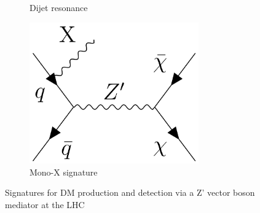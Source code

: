 \begin{figure}[hp]
\begin{subfigure}[t]{0.32\textwidth}
%
%				
\caption{Dijet resonance}
\label{fig:Feynman_Zprime_dijet}
\end{subfigure}
\begin{subfigure}[t]{0.32\textwidth}
	\centering
	\includegraphics[width=0.8\textwidth]{Figures/2/FeyZprime_monoX.pdf}
%
%				
\caption{Mono-X signature}
\label{fig:Feynman_Zprime_monoX}
\end{subfigure}
	\caption{Signatures for DM production and detection via a Z' vector boson mediator at the LHC}
	\label{fig:Feynman_Zprime}
\end{figure}

